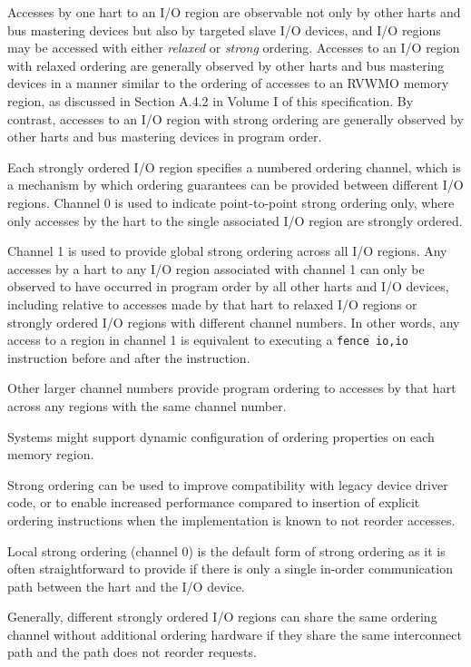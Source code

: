 Accesses by one hart to an I/O region are observable not only by other harts
and bus mastering devices but also by targeted slave I/O devices, and I/O
regions may be accessed with either {\em relaxed} or {\em strong} ordering.
Accesses to an I/O region with relaxed ordering are generally observed by
other harts and bus mastering devices in a manner similar to the ordering of
accesses to an RVWMO memory region, as discussed in Section A.4.2 in Volume
I of this specification.
By contrast, accesses to an I/O region with strong ordering are generally
observed by other harts and bus mastering devices in program order.

Each strongly ordered I/O region specifies a numbered ordering
channel, which is a mechanism by which ordering guarantees can be
provided between different I/O regions.  Channel 0 is used to indicate
point-to-point strong ordering only, where only accesses by the hart to the
single associated I/O region are strongly ordered.

Channel 1 is used to provide global strong ordering across all I/O
regions.  Any accesses by a hart to any I/O region associated with
channel 1 can only be observed to have occurred in program order by all
other harts and I/O devices, including relative to accesses made by
that hart to relaxed I/O regions or strongly ordered I/O regions with
different channel numbers.  In other words, any access to a region in
channel 1 is equivalent to executing a {\tt fence io,io}
instruction before and after the instruction.

Other larger channel numbers provide program ordering to accesses by
that hart across any regions with the same channel number.

Systems might support dynamic configuration of ordering properties on
each memory region.

\begin{commentary}
Strong ordering can be used to improve compatibility with legacy
device driver code, or to enable increased performance compared to
insertion of explicit ordering instructions when the implementation is
known to not reorder accesses.

Local strong ordering (channel 0) is the default form of strong
ordering as it is often straightforward to provide if there is only a
single in-order communication path between the hart and the I/O
device.

Generally, different strongly ordered I/O regions can share the same
ordering channel without additional ordering hardware if they share
the same interconnect path and the path does not reorder requests.
\end{commentary}

